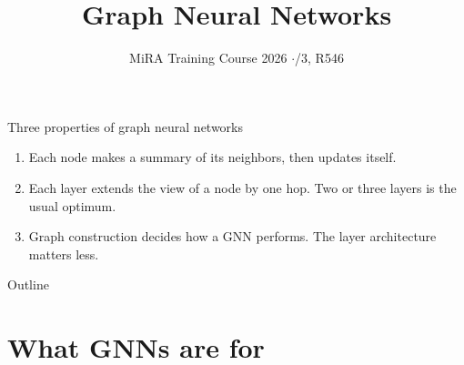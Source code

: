 \documentclass[aspectratio=169,11pt]{beamer}
\title{Graph Neural Networks}
\author{\CJK{仲翊}}
\date{MiRA Training Course 2026 \quad$\cdot$\quad 9/3, R546}
\begin{document}
\begin{frame}[plain]
  \titlepage
\end{frame}

\begin{frame}{Three properties of graph neural networks}
  \begin{enumerate}
    \setlength{\itemsep}{1.1em}
    \item Each node makes a \alert{summary of its neighbors}, then updates itself.
    \item Each layer extends the view of a node by \alert{one hop}. Two or three
          layers is the usual optimum.
    \item \alert{Graph construction} decides how a GNN performs. The layer
          architecture matters less.
  \end{enumerate}
\end{frame}

\begin{frame}{Outline}
  \tableofcontents
\end{frame}

\section{What GNNs are for}
\end{document}
